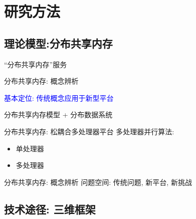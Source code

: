 \section{研究方法}

\subsection{理论模型:分布共享内存}

\begin{frame}{``分布共享内存''服务}
\end{frame}
\begin{frame}{分布共享内存: 概念辨析}
  \begin{center}
    \textcolor{blue}{\large 基本定位: 传统概念应用于新型平台}

    分布共享内存模型 + 分布数据系统
  \end{center}
\end{frame}
\begin{frame}{分布共享内存: 松耦合多处理器平台}
  多处理器并行算法:
  \begin{itemize}
    \item 单处理器
    \item 多处理器
  \end{itemize}
\end{frame}
\begin{frame}{分布共享内存: 概念辨析}
  问题空间: 传统问题, 新平台, 新挑战
\end{frame}
\subsection{技术途径: 三维框架}
